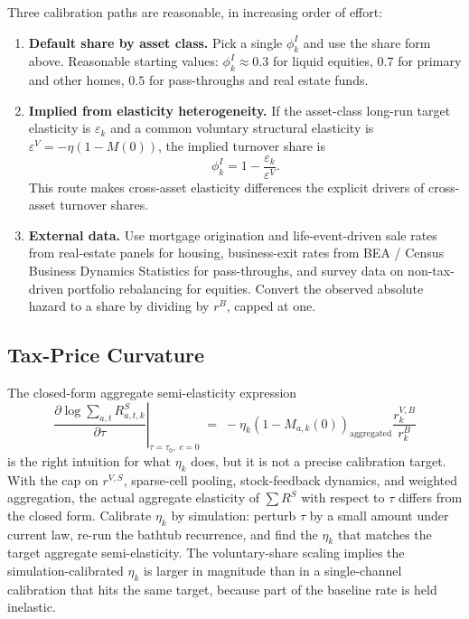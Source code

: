 \documentclass[11pt]{article}
\newcommand{\RS}{R^S}
\begin{document}
Three calibration paths are reasonable, in increasing order of effort:

\begin{enumerate}
  \item \textbf{Default share by asset class.} Pick a single $\phi^I_k$
        and use the share form above. Reasonable starting values:
        $\phi^I_k\approx 0.3$ for liquid equities, $0.7$ for primary
        and other homes, $0.5$ for pass-throughs and real estate funds.
  \item \textbf{Implied from elasticity heterogeneity.} If the
        asset-class long-run target elasticity is $\varepsilon_k$ and a
        common voluntary structural elasticity is
        $\varepsilon^V=-\eta(1-M(0))$, the implied turnover share is
        \[
        \phi^I_k = 1 - \frac{\varepsilon_k}{\varepsilon^V}.
        \]
        This route makes cross-asset elasticity differences the explicit
        drivers of cross-asset turnover shares.
  \item \textbf{External data.} Use mortgage origination and
        life-event-driven sale rates from real-estate panels for housing,
        business-exit rates from BEA / Census Business Dynamics
        Statistics for pass-throughs, and survey data on non-tax-driven
        portfolio rebalancing for equities. Convert the observed
        absolute hazard to a share by dividing by $r^B$, capped at one.
\end{enumerate}

\subsection{Tax-Price Curvature}

The closed-form aggregate semi-elasticity expression
\[
\left.
\frac{\partial \log \sum_{a,t}\RS_{a,t,k}}{\partial \tau}
\right|_{\tau=\tau_0,\;c=0}
\;=\;
-\eta_k
\left(1-M_{a,k}(0)\right)_{\mathrm{aggregated}}
\frac{r^{V,B}_k}{r^B_k}
\]
is the right intuition for what $\eta_k$ does, but it is not a precise
calibration target. With the cap on $r^{V,S}$, sparse-cell pooling,
stock-feedback dynamics, and weighted aggregation, the actual aggregate
elasticity of $\sum\RS$ with respect to $\tau$ differs from the closed
form. Calibrate $\eta_k$ by simulation: perturb $\tau$ by a small
amount under current law, re-run the bathtub recurrence, and find the
$\eta_k$ that matches the target aggregate semi-elasticity. The
voluntary-share scaling implies the simulation-calibrated $\eta_k$ is
larger in magnitude than in a single-channel calibration that hits the
same target, because part of the baseline rate is held inelastic.
\end{document}
